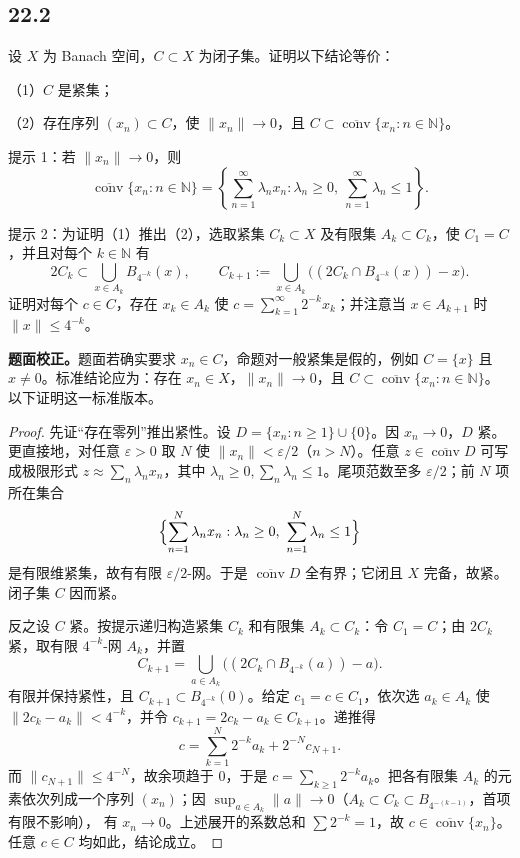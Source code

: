 \subsection*{22.2}
\begin{problem}
设 $X$ 为 Banach 空间，$C\subset X$ 为闭子集。证明以下结论等价：

（1）$C$ 是紧集；

（2）存在序列 $(x_n)\subset C$，使 $\|x_n\|\to0$，且
$C\subset\overline{\operatorname{conv}}\{x_n:n\in\mathbb N\}$。

提示 1：若 $\|x_n\|\to0$，则
\[
 \overline{\operatorname{conv}}\{x_n:n\in\mathbb N\}
 =\left\{\sum_{n=1}^{\infty}\lambda_nx_n:
 \lambda_n\geq0,\ \sum_{n=1}^{\infty}\lambda_n\leq1\right\}.
\]

提示 2：为证明（1）推出（2），选取紧集 $C_k\subset X$ 及有限集 $A_k\subset C_k$，使
$C_1=C$，并且对每个 $k\in\mathbb N$ 有
\[
 2C_k\subset\bigcup_{x\in A_k}B_{4^{-k}}(x),\qquad
 C_{k+1}:=\bigcup_{x\in A_k}\bigl((2C_k\cap B_{4^{-k}}(x))-x\bigr).
\]
证明对每个 $c\in C$，存在 $x_k\in A_k$ 使
$c=\sum_{k=1}^{\infty}2^{-k}x_k$；并注意当 $x\in A_{k+1}$ 时
$\|x\|\leq4^{-k}$。
\end{problem}

\textbf{题面校正。}题面若确实要求 $x_n\in C$，命题对一般紧集是假的，例如
$C=\{x\}$ 且 $x\neq0$。标准结论应为：存在 $x_n\in X$，$\|x_n\|\to0$，且
$C\subset\overline{\operatorname{conv}}\{x_n:n\in\mathbb N\}$。以下证明这一标准版本。

\begin{proof}
先证“存在零列”推出紧性。设 $D=\{x_n:n\geq1\}\cup\{0\}$。因 $x_n\to0$，$D$ 紧。
更直接地，对任意 $\varepsilon>0$ 取 $N$ 使 $\|x_n\|<\varepsilon/2$（$n>N$）。任意
$z\in\overline{\operatorname{conv}}D$ 可写成极限形式
$z\approx\sum_n\lambda_nx_n$，其中 $\lambda_n\geq0,\sum_n\lambda_n\leq1$。尾项范数至多
$\varepsilon/2$；前 $N$ 项所在集合
\[
 \Bigl\{\sum_{n=1}^N\lambda_nx_n:\lambda_n\geq0,\ \sum_{n=1}^N\lambda_n\leq1\Bigr\}
\]
是有限维紧集，故有有限 $\varepsilon/2$-网。于是 $\overline{\operatorname{conv}}D$ 全有界；它闭且
$X$ 完备，故紧。闭子集 $C$ 因而紧。

反之设 $C$ 紧。按提示递归构造紧集 $C_k$ 和有限集 $A_k\subset C_k$：令 $C_1=C$；由
$2C_k$ 紧，取有限 $4^{-k}$-网 $A_k$，并置
\[
 C_{k+1}=\bigcup_{a\in A_k}\bigl((2C_k\cap B_{4^{-k}}(a))-a\bigr).
\]
有限并保持紧性，且 $C_{k+1}\subset B_{4^{-k}}(0)$。给定 $c_1=c\in C_1$，依次选
$a_k\in A_k$ 使 $\|2c_k-a_k\|<4^{-k}$，并令 $c_{k+1}=2c_k-a_k\in C_{k+1}$。递推得
\[
 c=\sum_{k=1}^N2^{-k}a_k+2^{-N}c_{N+1}.
\]
而 $\|c_{N+1}\|\leq4^{-N}$，故余项趋于 $0$，于是
$c=\sum_{k\geq1}2^{-k}a_k$。把各有限集 $A_k$ 的元素依次列成一个序列 $(x_n)$；因
$\sup_{a\in A_k}\|a\|\to0$（$A_k\subset C_k\subset B_{4^{-(k-1)}}$，首项有限不影响），
有 $x_n\to0$。上述展开的系数总和 $\sum2^{-k}=1$，故
$c\in\overline{\operatorname{conv}}\{x_n\}$。任意 $c\in C$ 均如此，结论成立。
\end{proof}

